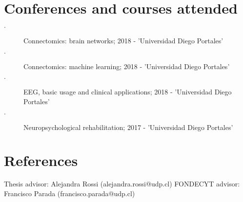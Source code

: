 \documentclass{article}
\begin{document}
\section{Conferences and courses attended}
\begin{description}
    \item[$\cdot$] Connectomics: brain networks; 2018 - 'Universidad Diego Portales'
    \item[$\cdot$] Connectomics: machine learning; 2018 - 'Universidad Diego Portales'
    \item[$\cdot$] EEG, basic usage and clinical applications; 2018 - 'Universidad Diego Portales'
    \item[$\cdot$] Neuropsychological rehabilitation; 2017 - 'Universidad Diego Portales'
\end{description}

\section{References}

Thesis advisor: Alejandra Rossi (alejandra.rossi@udp.cl)
FONDECYT advisor: Francisco Parada (francisco.parada@udp.cl)
\end{document}
